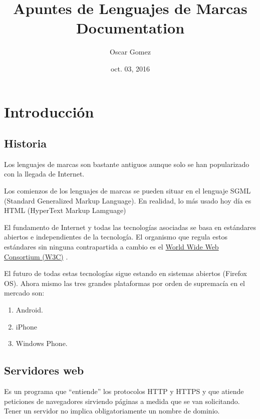 \documentclass[letterpaper,10pt,spanish]{sphinxmanual}
\title{Apuntes de Lenguajes de Marcas Documentation}
\date{oct. 03, 2016}
\author{Oscar Gomez}
\begin{document}
\maketitle
\tableofcontents
{}\label{index::doc}



\chapter{Introducción}
\label{tema1:introduccion}\label{tema1:apuntes-de-lenguajes-de-marcas}\label{tema1::doc}

\section{Historia}
\label{tema1:historia}
Los lenguajes de marcas son bastante antiguos aunque solo se han popularizado con la llegada de Internet.

Los comienzos de los lenguajes de marcas se pueden situar en el lenguaje SGML (Standard Generalized Markup Language). En realidad, lo más usado hoy día es HTML (HyperText Markup Lamguage)

El fundamento de Internet y todas las tecnologías asociadas se basa en estándares abiertos e
independientes de la tecnología. El organismo que regula estos estándares sin ninguna contrapartida a cambio es el \href{http://www.w3c.org}{World Wide Web Consortium (W3C)} .

El futuro de todas estas tecnologías sigue estando en sistemas abiertos (Firefox OS). Ahora mismo las tres grandes plataformas por orden de supremacía en el mercado son:
\begin{enumerate}
\item {} 
Android.

\item {} 
iPhone

\item {} 
Windows Phone.

\end{enumerate}


\section{Servidores web}
\label{tema1:servidores-web}
Es un programa que “entiende” los protocolos HTTP y HTTPS y que atiende peticiones de navegadores
sirviendo páginas a medida que se van solicitando. Tener un servidor no implica obligatoriamente un nombre de dominio.
\end{document}
